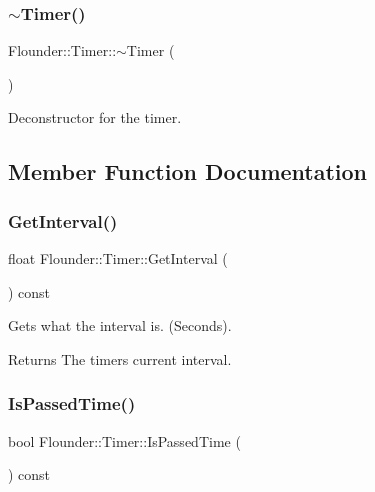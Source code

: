 \subsubsection{\texorpdfstring{$\sim$\+Timer()}{~Timer()}}
{\footnotesize\ttfamily Flounder\+::\+Timer\+::$\sim$\+Timer (\begin{DoxyParamCaption}{ }\end{DoxyParamCaption})}



Deconstructor for the timer. 



\subsection{Member Function Documentation}
\mbox{\label{class_flounder_1_1_timer_a5178fa6167df6f183c30cb18cc97c536}} 
\subsubsection{\texorpdfstring{Get\+Interval()}{GetInterval()}}
{\footnotesize\ttfamily float Flounder\+::\+Timer\+::\+Get\+Interval (\begin{DoxyParamCaption}{ }\end{DoxyParamCaption}) const}



Gets what the interval is. (Seconds). 

\begin{DoxyReturn}{Returns}
The timers current interval. 
\end{DoxyReturn}
\mbox{\label{class_flounder_1_1_timer_af8e56149f5d58d1c4b3b2d412fb46540}} 
\subsubsection{\texorpdfstring{Is\+Passed\+Time()}{IsPassedTime()}}
{\footnotesize\ttfamily bool Flounder\+::\+Timer\+::\+Is\+Passed\+Time (\begin{DoxyParamCaption}{ }\end{DoxyParamCaption}) const}



